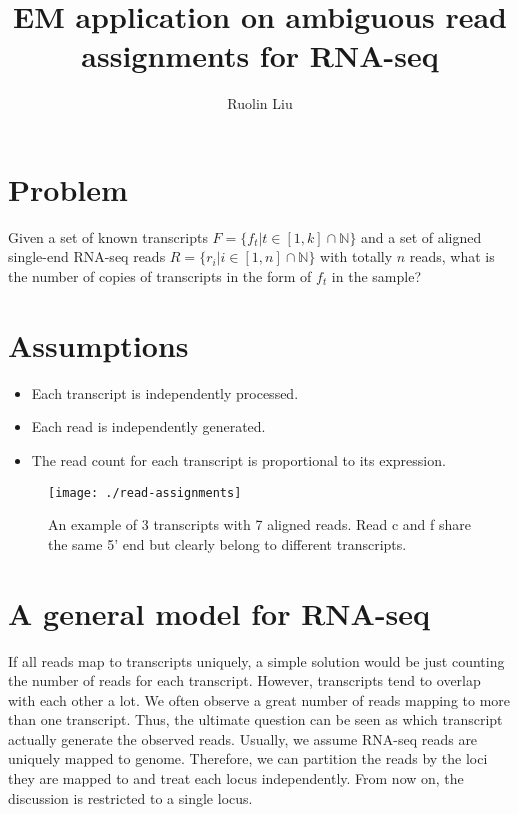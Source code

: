 \documentclass[12pt]{article}
\title{EM application on ambiguous read assignments for RNA-seq }
\author{Ruolin Liu}
\newcommand{\natN}{\mathbb{N}}
\begin{document}
\maketitle

\section{Problem}
Given a set of known transcripts $F = \{f_t|t\in[1, k] \cap \natN \}$ and a set of aligned single-end RNA-seq reads $R = \{r_i|i\in [1,n]  \cap \natN \}$ with totally $n$ reads, what is the number of copies of transcripts in the form of $f_t$ in the sample?

\section{Assumptions}
\begin{itemize}
\item Each transcript is independently processed.
\item Each read is independently generated.
\item The read count for each transcript is proportional to its expression.  
\end{itemize} 

\begin{figure}[H]
\centering
\texttt{[image: ./read-assignments]}
\caption{An example of 3 transcripts with 7 aligned reads. Read c and f share the same 5' end but clearly belong to different transcripts.}
\label{fig:read-assignments}
\end{figure}

\section{A general model for RNA-seq}
If all reads map to transcripts uniquely, a simple solution would be just counting the number of reads for each transcript. However, transcripts tend to overlap with each other a lot. We often observe a great number of reads mapping to more than one transcript. Thus, the ultimate question can be seen as which transcript actually generate the observed reads. Usually, we assume RNA-seq reads are uniquely mapped to genome. Therefore, we can partition the reads by the loci they are mapped to and treat each locus independently. From now on, the discussion is restricted to a single locus.

\begin{comment}
Let $y_i$ indicates the number of $i$\textit{th} read. Here $i$ does not range over 1 to $n$ but rather indexes the aligned genomic positions of both end of the read. Due to the fact that some reads are spliced aligned, either 5' end or 3'end by itself is not sufficient to pinpoint the set of compatible transcripts for some reads (Fig. 1). Based on this definition of index $i$, our observed data is a vector of counts $y = \left[y_1,..,y_i,...,y_m \right], y_i \in \natN$ and $\sum_{i}y_i=n$. $m$ is the total number of unique positions reads can be aligned to. 
\end{comment}
\end{document}
